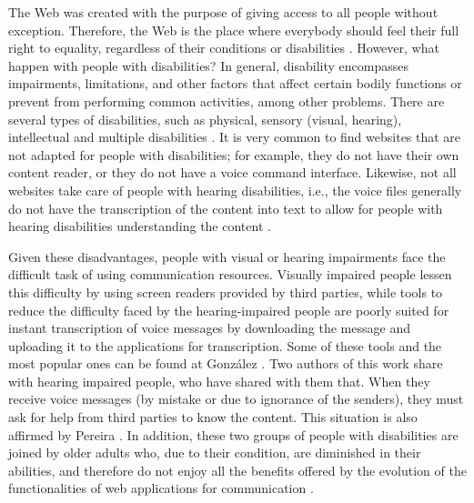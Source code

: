\documentclass{svproc}
\begin{document}
The Web was created with the purpose of giving access to all people without exception. Therefore, the Web is the place where everybody should feel their full right to equality, regardless of their conditions or disabilities \cite{Pelzetter2020}. However, what happen with people with disabilities? In general, disability encompasses impairments, limitations, and other factors that affect certain bodily functions or prevent from performing common activities, among other problems. There are several types of disabilities, such as physical, sensory (visual, hearing), intellectual and multiple disabilities \cite{Lister2020}. It is very common to find websites that are not adapted for people with disabilities; for example, they do not have their own content reader, or they do not have a voice command interface. Likewise, not all websites take care of people with hearing disabilities, i.e., the voice files generally do not have the transcription of the content into text to allow for people with hearing disabilities understanding the content \cite{DominguezVila2018}.

Given these disadvantages, people with visual or hearing impairments face the difficult task of using communication resources. Visually impaired people lessen this difficulty by using screen readers provided by third parties\cite{Morris2018}, while tools to reduce the difficulty faced by the hearing-impaired people are poorly suited for instant transcription of voice messages by downloading the message and uploading it to the applications for transcription. Some of these tools and the most popular ones can be found at González \cite{Gonzalez2021}. Two authors of this work share with hearing impaired people, who have shared with them that. When they receive voice messages (by mistake or due to ignorance of the senders), they must ask for help from third parties to know the content. This situation is also affirmed by  Pereira \cite{Pereira2010}. In addition, these two groups of people with disabilities are joined by older adults who, due to their condition, are diminished in their abilities, and therefore do not enjoy all the benefits offered by the evolution of the functionalities of web applications for communication \cite{Lister2020}.
\end{document}
